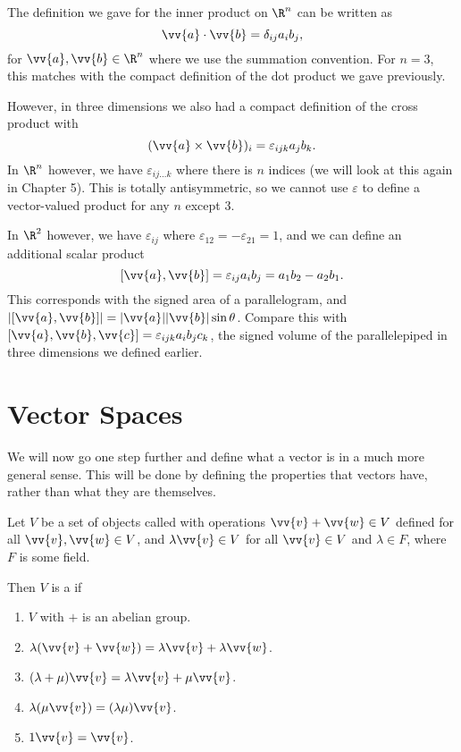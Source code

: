 The definition we gave for the inner product on $\R^n$ can be written as
$$
\vv{a} \cdot \vv{b} = \delta_{ij} a_i b_j,
$$
for $\vv{a}, \vv{b} \in \R^n$ where we use the summation convention. For $n = 3$, this matches with the compact definition of the dot product we gave previously.

However, in three dimensions we also had a compact definition of the cross product with
$$
(\vv{a} \times \vv{b})_i = \varepsilon_{ijk} a_j b_k.
$$
In $\R^n$ however, we have $\varepsilon_{ij\dots k}$ where there is $n$ indices (we will look at this again in Chapter 5). This is totally antisymmetric, so we cannot use $\varepsilon$ to define a vector-valued product for any $n$ except $3$. 

In $\R^2$ however, we have $\varepsilon_{ij}$ where $\varepsilon_{12} = - \varepsilon_{21} = 1$, and we can define an additional scalar product
$$
[\vv{a}, \vv{b}] = \varepsilon_{ij}a_i b_j = a_1 b_2 - a_2 b_1.
$$
This corresponds with the signed area of a parallelogram, and $|[\vv{a}, \vv{b}]| = |\vv{a}| |\vv{b}| \sin \theta$. Compare this with $[\vv{a}, \vv{b}, \vv{c}] = \varepsilon_{ijk}a_i b_j c_k$, the signed volume of the parallelepiped in three dimensions we defined earlier.

\section{Vector Spaces}

We will now go one step further and define what a vector is in a much more general sense.
This will be done by defining the properties that vectors have, rather than what they are themselves.

\begin{definition}
  Let $V$ be a set of objects called  with operations $\vv{v} + \vv{w} \in V$ defined for all $\vv{v}, 
\vv{w} \in V$, and $\lambda \vv{v} \in V$ for all $\vv{v} \in V$ and $\lambda \in F$, where $F$ is some field. 

Then $V$ is a  if
\begin{enumerate}[label=(\roman*)]
    \item $V$ with $+$ is an abelian group.
    \item $\lambda( \vv{v} + \vv{w}) = \lambda \vv{v} + \lambda \vv{w}$.
    \item $(\lambda  + \mu)\vv{v} = \lambda \vv{v} + \mu \vv{v}$.
    \item $\lambda (\mu \vv{v}) = (\lambda \mu) \vv{v}$.
    \item $1 \vv{v} = \vv{v}$.
\end{enumerate}
\end{definition}

